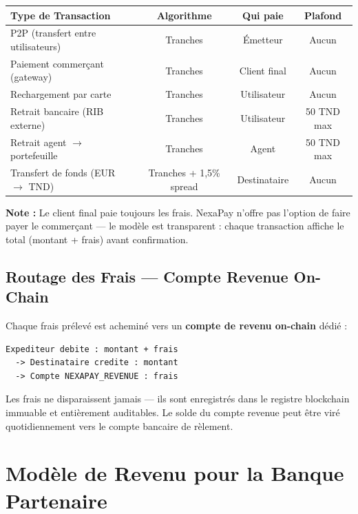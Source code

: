 \documentclass[11pt,a4paper]{article}
\begin{document}
\begin{center}
\begin{tabular}{|l|c|c|c|}
\hline
\textbf{Type de Transaction} & \textbf{Algorithme} & \textbf{Qui paie} & \textbf{Plafond} \\
\hline
P2P (transfert entre utilisateurs) & Tranches & \'Emetteur & Aucun \\
Paiement commer\c{c}ant (gateway) & Tranches & Client final & Aucun \\
Rechargement par carte & Tranches & Utilisateur & Aucun \\
Retrait bancaire (RIB externe) & Tranches & Utilisateur & 50 TND max \\
Retrait agent $\rightarrow$ portefeuille & Tranches & Agent & 50 TND max \\
Transfert de fonds (EUR $\rightarrow$ TND) & Tranches + 1,5\% spread & Destinataire & Aucun \\
\hline
\end{tabular}
\end{center}

\textbf{Note :} Le client final paie toujours les frais. NexaPay n'offre pas l'option de faire payer le commer\c{c}ant --- le mod\`ele est transparent : chaque transaction affiche le total (montant + frais) avant confirmation.

\newpage

\subsection{Routage des Frais --- Compte Revenue On-Chain}

Chaque frais pr\'elev\'e est achemin\'e vers un \textbf{compte de revenu on-chain} d\'edi\'e :

\begin{verbatim}
Expediteur debite : montant + frais
  -> Destinataire credite : montant
  -> Compte NEXAPAY_REVENUE : frais
\end{verbatim}

Les frais ne disparaissent jamais --- ils sont enregistr\'es dans le registre blockchain immuable et enti\`erement auditables. Le solde du compte revenue peut \^etre vir\'e quotidiennement vers le compte bancaire de r\`element.

\section{Mod\`ele de Revenu pour la Banque Partenaire}
\end{document}
